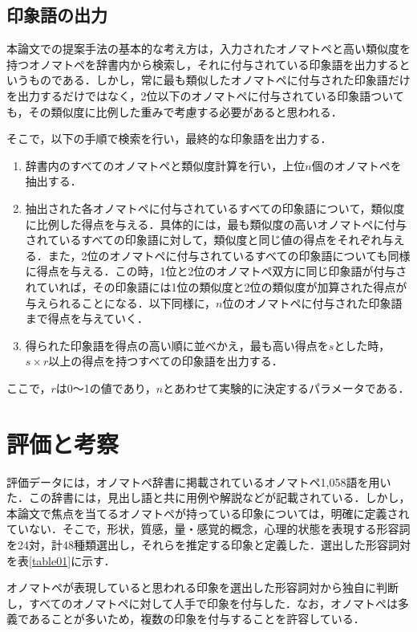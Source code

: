 \documentclass[japanese]{jnlp_1.4}
\newcommand{\addtext}[1]{}
\begin{document}
\subsection{印象語の出力}

本論文での提案手法の基本的な考え方は，入力されたオノマトペと高い類似度を持つオノマトペを辞書内から検索し，それに付与されている印象語を出力するというものである．しかし，常に最も類似したオノマトペに付与された印象語だけを出力するだけではなく，2位以下のオノマトペに付与されている印象語ついても，その類似度に比例した重みで考慮する必要があると思われる．

そこで，以下の手順で検索を行い，最終的な印象語を出力する．
\begin{enumerate}
\item 辞書内のすべてのオノマトペと類似度計算を行い，上位$n$個のオノマトペを抽出する．
\item 抽出された各オノマトペに付与されているすべての印象語について，類似度に比例した得点を与える．具体的には，最も類似度の高いオノマトペに付与されているすべての印象語に対して，類似度と同じ値の得点をそれぞれ与える．また，2位のオノマトペに付与されているすべての印象語についても同様に得点を与える．この時，1位と2位のオノマトペ双方に同じ印象語が付与されていれば，その印象語には1位の類似度と2位の類似度が加算された得点が与えられることになる．以下同様に，$n$位のオノマトペに付与された印象語まで得点を与えていく．
\item 得られた印象語を得点の高い順に並べかえ，最も高い得点を$s$とした時，$s\times r$以上の得点を持つすべての印象語を出力する．
\end{enumerate}
ここで，$r$は0〜1の値であり，$n$とあわせて実験的に決定するパラメータである．



\section{評価と考察}

評価データには，オノマトペ辞書\cite{Book_01}に掲載されているオノマトペ1,058語を用いた．この辞書には，見出し語と共に用例や解説などが記載されている．しかし，本論文で焦点を当てるオノマトペが持っている印象については，明確に定義されていない．そこで，形状，質感，量・感覚的概念，心理的状態を表現する形容詞を24対，計48種類選出し，それらを推定する印象と定義した．選出した形容詞対を表\ref{table01}に示す．\addtext{なお，推定する印象として使用する形容詞は，複数の文献{\cite{Book_02,Article_06}}}
\addtext{{\cite{Article_07,Article_08}}}
\addtext{{\cite{Article_09}}を参考に，討議の上決定した．}オノマトペが表現していると思われる印象を選出した形容詞対から独自に判断し，すべてのオノマトペに対して人手で印象を付与した．なお，オノマトペは多義であることが多いため，複数の印象を付与することを許容している．\addtext{例えば，「チラチラ」というオノマトペの印象は，「速い」，「小さい」，「少ない」，「軽い」という形容詞の集合で表現される．}
\end{document}
